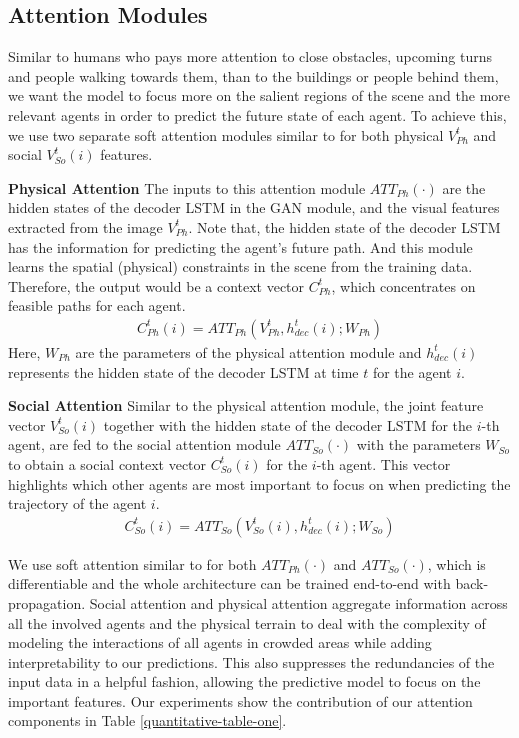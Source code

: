 \documentclass[10pt,twocolumn,letterpaper]{article}
\begin{document}
\subsection{Attention Modules}
\label{sec:Attention_Modules}
Similar to humans who pays more attention to close obstacles, upcoming turns and people walking towards them, than to the buildings or people behind them, we want the model to focus more on the salient regions of the scene and the more relevant agents in order to predict the future state of each agent. To achieve this, we use two separate soft attention modules similar to \cite{xu2015show} for both physical $V^t_{Ph}$ and social $V^t_{So}(i)$ features.
	
\textbf{Physical Attention} The inputs to this attention module $ATT_{Ph}(\cdot)$ are the hidden states of the decoder LSTM in the GAN module, and the visual features extracted from the image $V^t_{Ph}$. Note that, the hidden state of the decoder LSTM has the information for predicting the agent's future path. And this module learns the spatial (physical) constraints in the scene from the training data. Therefore, the output would be a context vector $C^t_{Ph}$, which concentrates on feasible paths for each agent. 
\begin{eqnarray}
\label{eq:pcontext}
C^t_{Ph}(i) = ATT_{Ph}(V^t_{Ph}, h_{dec}^{t}(i); W_{Ph})
\end{eqnarray}
Here, $W_{Ph}$ are the parameters of the physical attention module and $h^{t}_{dec}(i)$ represents the hidden state of the decoder LSTM at time $t$ for the agent $i$.



\textbf{Social Attention} Similar to the physical attention module, the joint feature vector $V^t_{So}(i)$ together with the hidden state of the decoder LSTM for the $i$-th agent, are fed to the social attention module $ATT_{So}(\cdot)$ with the parameters $W_{So}$ to obtain a social context vector $C^t_{So}(i)$ for the $i$-th agent. This vector highlights which other agents are most important to focus on when predicting the trajectory of the agent $i$.
\begin{eqnarray}
\label{eq:scontext}
C^t_{So}(i) = ATT_{So}(V^{t}_{So}(i), h^{t}_{dec}(i); W_{So})
\end{eqnarray}

We use soft attention similar to \cite{xu2015show} for both $ATT_{Ph}(\cdot)$ and $ATT_{So}(\cdot)$, which is differentiable and the whole architecture can be trained end-to-end with back-propagation. Social attention and physical attention aggregate information across all the involved agents and the physical terrain to deal with the complexity of modeling the interactions of all agents in crowded areas while adding interpretability to our predictions. This also suppresses the redundancies of the input data in a helpful fashion, allowing the predictive model to focus on the important features. Our experiments show the contribution of our attention components in Table \ref{quantitative-table-one}.
 
\end{document}
